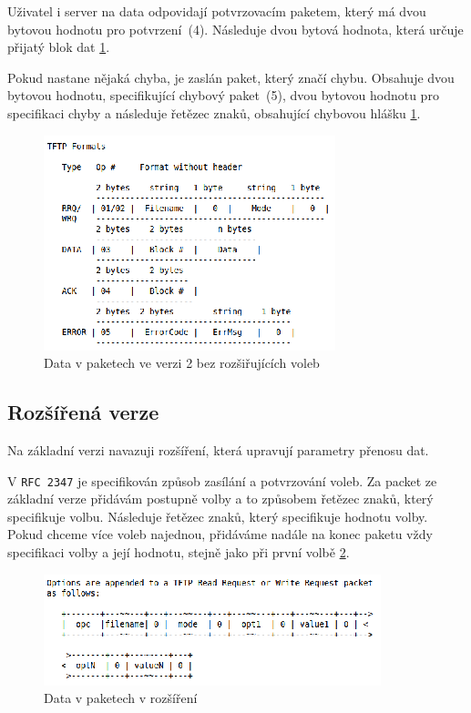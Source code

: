 \documentclass[11pt]{article}
\begin{document}
Uživatel i server na data odpovidají potvrzovacím paketem, který má dvou bytovou hodnotu pro potvrzení~(4). Následuje dvou bytová hodnota, která určuje přijatý blok dat \ref{pict:RFC_1350_packets}.

Pokud nastane nějaká chyba, je zaslán paket, který značí chybu. Obsahuje dvou bytovou hodnotu, specifikující chybový paket~(5), dvou bytovou hodnotu pro specifikaci
chyby a následuje řetězec znaků, obsahující chybovou hlášku \ref{pict:RFC_1350_packets}.  

\begin{figure}[ht]
    \label{pict:RFC_1350_packets} 
    \centering
    \includegraphics[scale=2.0]{RFC_1350_packets.eps}
    \caption{Data v paketech ve verzi 2 bez rozšiřujících voleb \cite{revision2}}        
\end{figure}

\subsection{Rozšířená verze}
Na základní verzi navazuji rozšíření, která upravují parametry přenosu dat.

V \texttt{RFC 2347} je specifikován způsob zasílání a potvrzování voleb. Za packet ze základní verze přidávám postupně volby a to způsobem řetězec znaků,
který specifikuje volbu. Následuje řetězec znaků, který specifikuje hodnotu volby. Pokud chceme více voleb najednou, přidáváme nadále
na konec paketu vždy specifikaci volby a její hodnotu, stejně jako při první volbě \ref{pict:RFC_1347_option_list.eps}. 

\begin{figure}[ht]
    \label{pict:RFC_1347_option_list.eps} 
    \centering
    \includegraphics[scale=2.0]{RFC_2347_option_list.eps}
    \caption{Data v paketech v rozšíření \cite{option_extension}}        
\end{figure}
\end{document}
